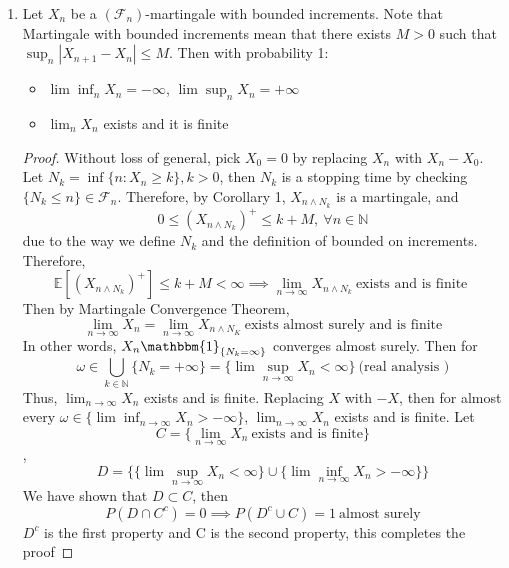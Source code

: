\documentclass[10pt]{article}
\begin{document}

\newpage
\printbibliography
\clearpage

\appendix


\begin{enumerate}
    \item 

Let $X_n$ be a $(\mathcal{F}_n)$-martingale with bounded increments. Note that Martingale with bounded increments mean that there exists $M>0$ such that $\sup_n |X_{n+1}-X_n|\le M$. Then with probability 1:\begin{itemize}
    \item $\lim \inf_n X_n=-\infty$, $\lim \sup_n X_n=+\infty$
    \item $\lim_n X_n$ exists and it is finite
\end{itemize}

\begin{proof}
Without loss of general, pick $X_0=0$ by replacing $X_n$ with $X_n-X_0$. Let $N_k=\inf\{n:X_n\ge k\}, k>0$, then $N_k$ is a stopping time by checking $\{N_k \le n\}\in \mathcal{F}_n$. Therefore, by Corollary 1, $X_{n\wedge N_k}$ is a martingale, and $$0\le (X_{n\wedge N_k})^{+}\le k+M, \ \forall n \in \mathbb{N}$$ due to the way we define $N_k$ and the definition of bounded on increments. Therefore, $$\mathbb{E}[(X_{n\wedge N_k})^{+}]\le k+M<\infty \implies \lim_{n \to \infty}X_{n \wedge N_k}\ \text{exists and is finite }$$ Then by Martingale Convergence Theorem, $$\lim_{n \to \infty}X_n=\lim_{n \to \infty}X_{n \wedge N_K}  \ \text{exists almost surely and is finite}$$ In other words, $X_n\mathbbm{1}_{\{N_k=\infty\}}$ converges almost surely. Then for $$\omega  \in \bigcup_{k \in \mathbb{N}}\{N_k=+\infty\}=\{\lim \sup_{n \to \infty}X_n<\infty\} \ (\text{real analysis )}$$
Thus, $\lim_{n \to \infty}X_n$ exists and is finite. Replacing $X$ with $-X$, then for almost every $\omega \in \{\lim \inf_{n \to \infty}X_n>-\infty\}$, $\lim_{n \to \infty}X_n$ exists and is finite. Let $$C=\{\lim_{n \to \infty}X_n \ \text{exists and is finite}\}$$, $$D=\{\{\lim \sup_{n \to \infty}X_n<\infty\}\cup \{\lim \inf_{n \to \infty} X_n>-\infty\}\}$$
We have shown that $D \subset C$, then $$P(D \cap C^c)=0 \implies P(D^c \cup C)=1 \ \text{almost surely}$$
$D^c$ is the first property and C is the second property, this completes the proof


\end{proof}
\end{enumerate}
\end{document}
